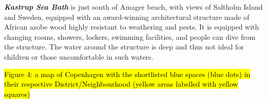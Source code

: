\documentclass{article}
\newcommand{\bisection}[1]{\textbf{\textit{#1}}}
\begin{document}
\bisection{Kastrup Sea Bath} is just south of Amager beach, with views of Saltholm Island and Sweden, equipped with an award-winning architectural structure made of African azobe wood highly resistant to weathering and pests. It is equipped with changing rooms, showers, lockers, swimming facilities, and people can dive from the structure. The water around the structure is deep and thus not ideal for children or those uncomfortable in such waters.

\hl{Figure 4: a map of Copenhagen with the shortlisted blue spaces (blue dots) in their respective District/Neighbourhood (yellow areas labelled with yellow squares)}

\begin{comment}

\bisection{Environmental justice}
Environmental justice (EJ) provides a lens through which to understand social and environmental inequalities related to blue spaces. By bringing together social and environmental concerns, the environmental justice paradigm advocates for the equal access to the benefits offered by natural spaces; and, in turn, sharing environmental burdens. 
EJ is traditionally broken down into three dimensions: distributional justice, procedural justice, and recognition justice \parencite{todo:cite schlosberg}.
Recognising the experience of those who do not fit into the `norm' also means acknowledging that some practices take place in the private and not public sphere, because of historical racial, sexist, ethnic discrimination. For example, women who disproportionally carry out domestic and care work have a different daily pattern which does not match that of the average 9-5 worker, and the spaces and mobility options should be adapted for them to reach blue spaces with ease. Or, they may feel more vulnerable and less safe in public, and prefer private spaces \parencite{wessells2014urban}. How can blue spaces be inclusive of a diversity of people, carrying out a diversity of activities at all times of the day, week, or year? 

\end{comment}
\end{document}
